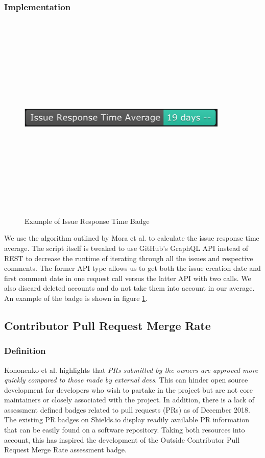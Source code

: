 \documentclass[12pt, letterpaper]{article}
\begin{document}
\subsubsection{Implementation}

\begin{figure}[!htb]
    \centerline{
        \includegraphics[width=10cm,height=10cm,keepaspectratio=true]{issueresponsebadge}
    }
    \caption{
        Example of Issue Response Time Badge
    }
    \label{issueresponse}
\end{figure}

We use the algorithm outlined by Mora et al. \cite{metrics} to calculate the issue response time average.
The script itself is tweaked to use GitHub's \cite{github} GraphQL API instead of REST to decrease the 
runtime of iterating through
all the issues and respective comments. 
The former API type allows us to get both the issue creation date and first
comment date in one request call versus the latter API with two calls.
We also discard deleted accounts and do not take them into account in our average.
An example of the badge is shown in figure \ref{issueresponse}.


\subsection{Contributor Pull Request Merge Rate}
\subsubsection{Definition}
Kononenko et al. \cite{shopifyarticle} highlights that \textit{PRs submitted by the owners are approved more
quickly compared to those made by external devs}. This can hinder open source development
for developers who wish to partake in the project but are not core maintainers or closely associated with the project.
In addition, there is a lack of assessment defined badges \cite{githubbadges} related to pull requests (PRs)
as of December 2018.
The existing PR badges on Shields.io \cite{shields} display readily available PR information that can be easily found on a 
software repository. Taking both resources \cite{shields, shopifyarticle} into account, this has inspired
the development of the Outside Contributor Pull Request Merge Rate assessment badge. 
\end{document}
